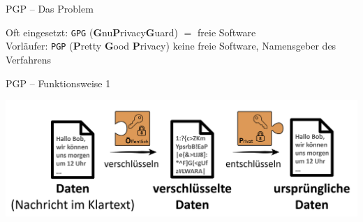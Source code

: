 \documentclass{beamer}
\begin{document}
\begin{frame}[label=bg2]{PGP – Das Problem}
  \pause

  Oft eingesetzt: \texttt{GPG} (\textbf{G}nu\textbf{P}rivacy\textbf{G}uard) $=$ freie Software\\[2mm]
  {\tiny Vorläufer: \texttt{PGP} (\textbf{P}retty \textbf{G}ood \textbf{P}rivacy) keine freie Software, Namensgeber des Verfahrens}\\  



\end{frame}


\begin{frame}{PGP – Funktionsweise 1}

\begin{center}
\includegraphics[width=\textwidth]{img-src/pgp_ver_entschluesseln.png}
\end{center}
\end{frame}

\end{document}
